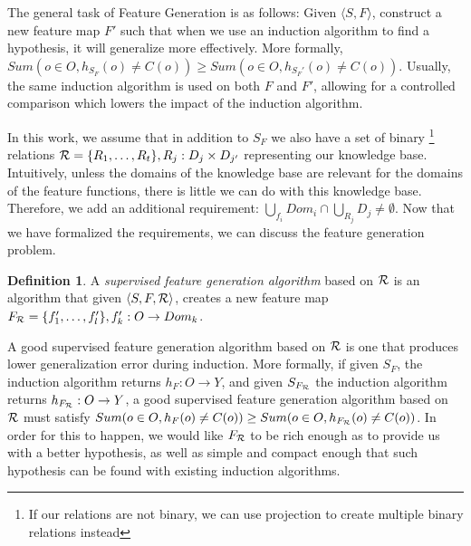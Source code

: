 \documentclass[twoside,11pt]{article}
\theoremstyle{definition}
\newtheorem{defn}{Definition}[section]
\begin{document}
The general task of Feature Generation is as follows: Given $\langle S,F\rangle$, construct a new feature map $F'$ such that when we use an induction algorithm to find a hypothesis, it will generalize more effectively. More formally, $Sum(o\in O,h_{S_F}(o)\neq C(o)) \geq Sum(o\in O,h_{S_F'}(o)\neq C(o))$. Usually, the same induction algorithm is used on both $F$ and $F'$, allowing for a controlled comparison which lowers the impact of the induction algorithm. 

In this work, we assume that in addition to $S_F$ we also have a set of binary \footnote{If our relations are not binary, we can use projection to create multiple binary relations instead} relations ${\cal R}=\{R_{1},\ldots,R_{t}\}, R_j:D_j\times D_{j'}$ representing our knowledge base. 
Intuitively, unless the domains of the knowledge base are relevant for the domains of the feature functions, there is little we can do with this knowledge base. 
Therefore, we add an additional requirement: $\bigcup_{f_i} Dom_i \cap \bigcup_{R_j} D_j \neq \emptyset$. Now that we have formalized the requirements, we can discuss the feature generation problem.

\begin{defn}
	A \emph{supervised feature generation algorithm} based on ${\cal R}$ is an algorithm that given $\langle S,F,{\cal R} \rangle$, creates a new feature map $F_{{\cal R}}=\{f'_{1},\ldots,f'_{l}\}, f'_{k}:O\rightarrow Dom_k$.
\end{defn}

A good supervised feature generation algorithm based on ${\cal R}$ is one that produces lower generalization error during induction. More formally, if given $S_F$, the induction algorithm returns $h_F:O\rightarrow Y$, and given $S_{F_{{\cal R}}}$ the induction algorithm returns $h_{F_{{\cal R}}}:O\rightarrow Y$, a good supervised feature generation algorithm based on ${\cal R}$ must satisfy $Sum(o\in O,h_F(o)\neq C(o)) \geq Sum(o\in O,h_{F_{{\cal R}}}(o)\neq C(o))$.
In order for this to happen, we would like $F_{{\cal R}}$ to be rich enough as to provide us with a better hypothesis, as well as simple and compact enough that such hypothesis can be found with existing induction algorithms.

\end{document}
